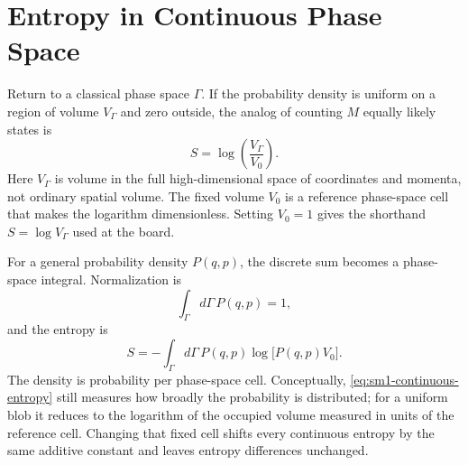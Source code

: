 \begin{classroomqa}
\end{classroomqa}

\section{Entropy in Continuous Phase Space}

Return to a classical phase space \(\Gamma\). If the probability density is
uniform on a region of volume \(V_\Gamma\) and zero outside, the analog of
counting \(M\) equally likely states is
\begin{equation}
 S=\log\!\left(\frac{V_\Gamma}{V_0}\right).
 \label{eq:sm1-continuous-uniform}
\end{equation}
Here \(V_\Gamma\) is volume in the full high-dimensional space of coordinates
and momenta, not ordinary spatial volume. The fixed volume \(V_0\) is a
reference phase-space cell that makes the logarithm dimensionless. Setting
\(V_0=1\) gives the shorthand \(S=\log V_\Gamma\) used at the board.

For a general probability density \(P(q,p)\), the discrete sum becomes a
phase-space integral. Normalization is
\begin{equation}
 \int_\Gamma d\Gamma\,P(q,p)=1,
 \label{eq:sm1-continuous-normalization}
\end{equation}
and the entropy is
\begin{equation}
 S=-\int_\Gamma d\Gamma\,
 P(q,p)\log\!\bigl[P(q,p)V_0\bigr].
 \label{eq:sm1-continuous-entropy}
\end{equation}
The density is probability per phase-space cell. Conceptually,
\eqref{eq:sm1-continuous-entropy} still measures how broadly the probability
is distributed; for a uniform blob it reduces to the logarithm of the
occupied volume measured in units of the reference cell. Changing that fixed
cell shifts every continuous entropy by the same additive constant and leaves
entropy differences unchanged.

\begin{classroomqa}
\end{classroomqa}

